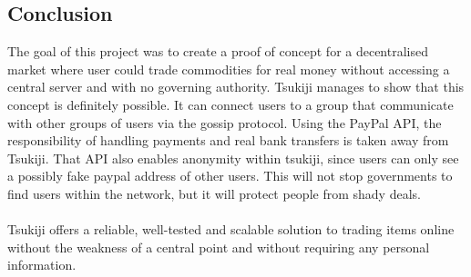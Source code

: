 \subsection{Conclusion}
The goal of this project was to create a proof of concept for a decentralised market where user could trade commodities for real money without accessing a central server and with no governing authority.
Tsukiji manages to show that this concept is definitely possible. It can connect users to a group that communicate with other groups of users via the gossip protocol.
Using the PayPal API, the responsibility of handling payments and real bank transfers is taken away from Tsukiji.
That API also enables anonymity within tsukiji, since users can only see a possibly fake paypal address of other users.
This will not stop governments to find users within the network, but it will protect people from shady deals.\\
\\
Tsukiji offers a reliable, well-tested and scalable solution to trading items online without the weakness of a central point and without requiring any personal information.
